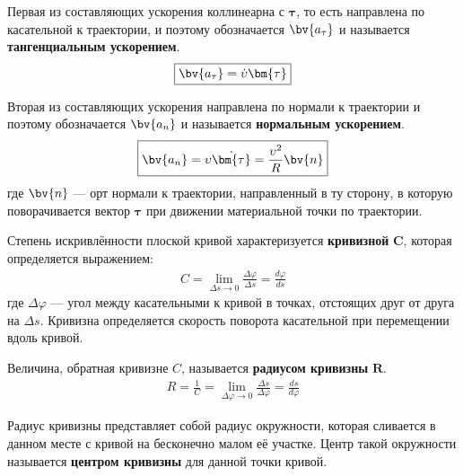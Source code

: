 \begin{definition}
    Первая из составляющих ускорения коллинеарна с $\bm{\tau}$, то есть направлена по касательной к траектории, и поэтому обозначается $\bv{a_\tau}$ и называется \textbf{тангенциальным ускорением}.
    \begin{gather}
        \boxed{\bv{a_\tau} = \dot{\upsilon}\bm{\tau}}
    \end{gather}
\end{definition}

\begin{definition}
    Вторая из составляющих ускорения направлена по нормали к траектории и поэтому обозначается $\bv{a_n}$ и называется \textbf{нормальным ускорением}.
    \begin{gather}
        \boxed{\bv{a_n} = \upsilon \dot{\bm{\tau}} = \frac{\upsilon^2}{R}\bv{n}}
    \end{gather}
    где $\bv{n}$ --- орт нормали к траектории, направленный в ту сторону, в которую поворачивается вектор $\bm{\tau}$ при движении материальной точки по траектории.
\end{definition}
\newpage
\begin{definition}
    Степень искривлённости плоской кривой характеризуется \textbf{кривизной} $\bm{C}$, которая определяется выражением:
    \begin{gather}
        C = \lim_{\Delta s \to 0} \frac{\Delta \varphi}{\Delta s} = \frac{d\varphi}{ds}
    \end{gather}
    где $\Delta \varphi$ --- угол между касательными к кривой в точках, отстоящих друг от друга на $\Delta s$. Кривизна определяется скорость поворота касательной при перемещении вдоль кривой.
\end{definition}

\begin{definition}
    Величина, обратная кривизне $C$, называется \textbf{радиусом кривизны} $\bm{R}$.
    \begin{gather}
        R = \frac{1}{C} = \lim_{\Delta \varphi \to 0} \frac{\Delta s}{\Delta \varphi} = \frac{ds}{d\varphi}
    \end{gather}
\end{definition}

\begin{definition}
    Радиус кривизны представляет собой радиус окружности, которая сливается в данном месте с кривой на бесконечно малом её участке. Центр такой окружности называется \textbf{центром кривизны} для данной точки кривой.
\end{definition}


